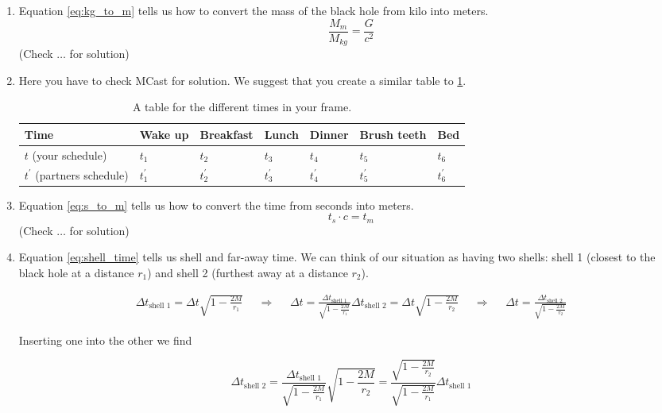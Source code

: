 \documentclass[a4paper,10pt,english]{article}
\begin{document}
\begin{enumerate}

\item Equation \ref{eq:kg_to_m} tells us how to convert the mass of the black hole from kilo into meters. \[\frac{M_{m}}{M_{kg}}=\frac{G}{c^{2}}\] (Check $\ldots$ for solution)

\item Here you have to check MCast for solution. We suggest that you create a similar table to \ref{table:1}.

  \begin{table}[H]
  \begin{center}
    \begin{tabular}{| l | l | l | l | l | l | l | }
   	\hline
	Time & Wake up & Breakfast & Lunch & Dinner & Brush teeth & Bed \\ \hline
	 $t$ (your schedule) & $t_{1}$ & $t_{2}$ & $t_{3}$ & $t_{4}$ & $t_{5}$ & $t_{6}$ \\ \hline
	 $t^{\prime}$ (partners schedule) & $t^{\prime}_{1}$ & $t^{\prime}_{2}$ & $t^{\prime}_{3}$ & $t^{\prime}_{4}$ & $t^{\prime}_{5}$ & $t^{\prime}_{6}$\\ \hline
	\end{tabular}
    \caption{A table for the different times in your frame.}
    \label{table:1}
  \end{center}
\end{table}


\item Equation \ref{eq:s_to_m} tells us how to convert the time from seconds into meters. \[t_{s}\cdot c=t_{m}\] (Check $\ldots$ for solution)

\item Equation \ref{eq:shell_time} tells us shell and far-away time. We can think of our situation as having two shells: shell 1 (closest to the black hole at a distance $r_{1}$) and shell 2 (furthest away at a distance $r_{2}$).

\begin{align*}
\Delta t_{\text{shell 1}}=\Delta t\sqrt{1-\frac{2M}{r_{1}}} &&\Rightarrow&& \Delta t=\frac{\Delta t_{\text{shell 1}}}{\sqrt{1-\frac{2M}{r_{1}}}}
\Delta t_{\text{shell 2}}=\Delta t\sqrt{1-\frac{2M}{r_{2}}} &&\Rightarrow&& \Delta t=\frac{\Delta t_{\text{shell 2}}}{\sqrt{1-\frac{2M}{r_{2}}}}
\end{align*}

Inserting one into the other we find

\begin{equation*}
\Delta t_{\text{shell 2}}=\frac{\Delta t_{\text{shell 1}}}{\sqrt{1-\frac{2M}{r_{1}}}}\sqrt{1-\frac{2M}{r_{2}}}=\frac{\sqrt{1-\frac{2M}{r_{2}}}}{\sqrt{1-\frac{2M}{r_{1}}}}\Delta t_{\text{shell 1}}
\end{equation*}


\end{enumerate}
\end{document}
